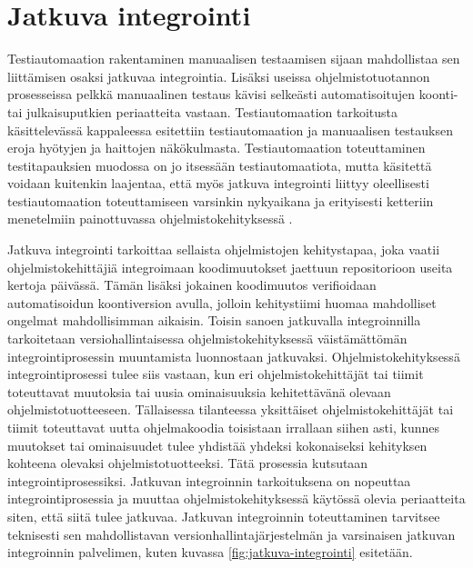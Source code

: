 \section{Jatkuva integrointi} \label{ch:07_jatkuva_integrointi}

  Testiautomaation rakentaminen manuaalisen testaamisen sijaan mahdollistaa sen liittämisen osaksi jatkuvaa integrointia.
  Lisäksi useissa ohjelmistotuotannon prosesseissa pelkkä manuaalinen testaus kävisi selkeästi automatisoitujen koonti- tai julkaisuputkien periaatteita vastaan.
  Testiautomaation tarkoitusta käsittelevässä kappaleessa esitettiin testiautomaation ja manuaalisen testauksen eroja hyötyjen ja haittojen näkökulmasta.
  Testiautomaation toteuttaminen testitapauksien muodossa on jo itsessään testiautomaatiota, mutta käsitettä voidaan kuitenkin laajentaa, että myös jatkuva integrointi liittyy oleellisesti testiautomaation toteuttamiseen varsinkin nykyaikana ja erityisesti ketteriin menetelmiin painottuvassa ohjelmistokehityksessä \cite{agile_testing_book}.

  Jatkuva integrointi tarkoittaa sellaista ohjelmistojen kehitystapaa, joka vaatii ohjelmistokehittäjiä integroimaan koodimuutokset jaettuun repositorioon useita kertoja päivässä.
  Tämän lisäksi jokainen koodimuutos verifioidaan automatisoidun koontiversion avulla, jolloin kehitystiimi huomaa mahdolliset ongelmat mahdollisimman aikaisin. \cite[s.~23]{devops_for_web_book}
  Toisin sanoen jatkuvalla integroinnilla tarkoitetaan versiohallintaisessa ohjelmistokehityksessä väistämättömän integrointiprosessin muuntamista luonnostaan jatkuvaksi.
  Ohjelmistokehityksessä integrointiprosessi tulee siis vastaan, kun eri ohjelmistokehittäjät tai tiimit toteuttavat muutoksia tai uusia ominaisuuksia kehitettävänä olevaan ohjelmistotuotteeseen.
  Tällaisessa tilanteessa yksittäiset ohjelmistokehittäjät tai tiimit toteuttavat uutta ohjelmakoodia toisistaan irrallaan siihen asti, kunnes muutokset tai ominaisuudet tulee yhdistää yhdeksi kokonaiseksi kehityksen kohteena olevaksi ohjelmistotuotteeksi.
  Tätä prosessia kutsutaan integrointiprosessiksi.
  Jatkuvan integroinnin tarkoituksena on nopeuttaa integrointiprosessia ja muuttaa ohjelmistokehityksessä käytössä olevia periaatteita siten, että siitä tulee jatkuvaa.
  Jatkuvan integroinnin toteuttaminen tarvitsee teknisesti sen mahdollistavan versionhallintajärjestelmän ja varsinaisen jatkuvan integroinnin palvelimen, kuten kuvassa \ref{fig:jatkuva-integrointi} esitetään.

